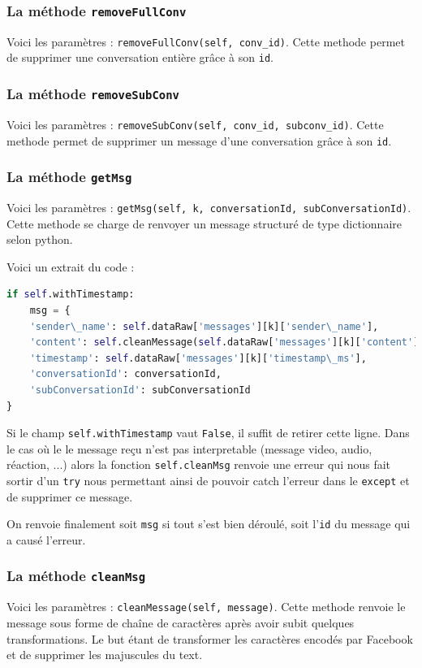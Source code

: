 \documentclass[10pt,a4paper]{article}
\begin{document}
\subsubsection{La méthode \texttt{removeFullConv}}
Voici les paramètres : \texttt{removeFullConv(self, conv\_id)}. Cette methode permet de supprimer une conversation entière grâce à son \texttt{id}.

\subsubsection{La méthode \texttt{removeSubConv}}
Voici les paramètres : \texttt{removeSubConv(self, conv\_id, subconv\_id)}. Cette methode permet de supprimer un message d'une conversation grâce à son \texttt{id}.

\subsubsection{La méthode \texttt{getMsg}}
Voici les paramètres : \texttt{getMsg(self, k, conversationId, subConversationId)}. Cette methode se charge de renvoyer un message structuré de type dictionnaire selon python. 

Voici un extrait du code :
\begin{lstlisting}[language=Python]
if self.withTimestamp:
	msg = {
	'sender\_name': self.dataRaw['messages'][k]['sender\_name'],
	'content': self.cleanMessage(self.dataRaw['messages'][k]['content']),
	'timestamp': self.dataRaw['messages'][k]['timestamp\_ms'],
	'conversationId': conversationId,
	'subConversationId': subConversationId
}
\end{lstlisting}

Si le champ \texttt{self.withTimestamp} vaut \texttt{False}, il suffit de retirer cette ligne. Dans le cas où le le message reçu n'est pas interpretable (message video, audio, réaction, ...) alors la fonction \texttt{self.cleanMsg} renvoie une erreur qui nous fait sortir d'un \texttt{try} nous permettant ainsi de pouvoir catch l'erreur dans le \texttt{except} et de supprimer ce message.

On renvoie finalement soit \texttt{msg} si tout s'est bien déroulé, soit l'\texttt{id} du message qui a causé l'erreur.

\subsubsection{La méthode \texttt{cleanMsg}}
Voici les paramètres : \texttt{cleanMessage(self, message)}. Cette methode renvoie le message sous forme de chaîne de caractères après avoir subit quelques transformations. Le but étant de transformer les caractères encodés par Facebook et de supprimer les majuscules du text.
\end{document}

